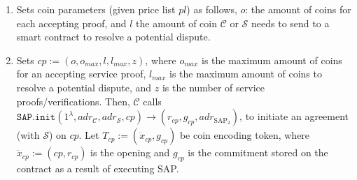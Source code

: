 \begin{enumerate}
\begin{enumerate}
\item   Sets coin parameters (given  price list $pl$) as  follows,  $o$: the amount of coins for each accepting proof,  and $l$ the amount of coin $\mathcal C$  or $\mathcal S$ needs to send to a smart contract to resolve a potential dispute. 


%






\item  Sets  $cp:=(o,o_{\scriptscriptstyle max}, l,  l_{\scriptscriptstyle max},z)$, where $o_{\scriptscriptstyle max}$ is the maximum amount of coins  for an accepting service proof,  $l_{\scriptscriptstyle max}$  is the maximum amount of coins to resolve a potential dispute, and $z$ is the number of  service proofs/verifications. Then, $\mathcal C$ calls $\mathtt{SAP.init}(1^{\scriptscriptstyle\lambda}, adr_{\scriptscriptstyle\mathcal{C}}, adr_{\scriptscriptstyle\mathcal{S}},cp )\rightarrow(r_{\scriptscriptstyle cp},g_{\scriptscriptstyle cp},adr_{\scriptscriptstyle\text{SAP}_{\scriptscriptstyle 2}})$, to initiate an agreement (with $\mathcal{S}$) on $cp$. Let $T_{\scriptscriptstyle cp}:=(\ddot{x}_{\scriptscriptstyle cp},g_{\scriptscriptstyle cp})$ be coin encoding token,  where  $\ddot{x}_{\scriptscriptstyle cp}:=(cp,r_{\scriptscriptstyle cp})$ is the opening and $g_{\scriptscriptstyle cp}$ is the commitment stored on the contract as a result of executing   SAP.  






\end{enumerate}
\end{enumerate}
